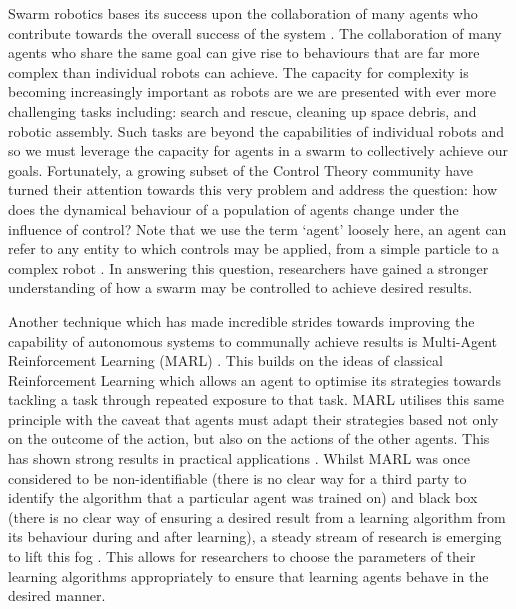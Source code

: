 \documentclass[.../main.tex]{subfiles}
\begin{document}
    Swarm robotics bases its success upon the collaboration of many agents who contribute towards
    the overall success of the system \cite{Hamann2018}. The collaboration of many agents who share
    the same goal can give rise to behaviours that are far more complex than individual robots can
    achieve. The capacity for complexity is becoming increasingly important as robots are we are
    presented with ever more challenging tasks including: search and rescue, cleaning up space
    debris, and robotic assembly. Such tasks are beyond the capabilities of individual robots and so
    we must leverage the capacity for agents in a swarm to collectively achieve our goals.
    Fortunately, a growing subset of the Control Theory community have turned their attention
    towards this very problem and address the question: how does the dynamical behaviour of a
    population of agents change under the influence of control? Note that we use the term `agent'
    loosely here, an agent can refer to any entity to which controls may be applied, from a simple
    particle \cite{Roy2017} to a complex robot \cite{Elamvazhuthi2019}. In answering this question,
    researchers have gained a stronger understanding of how a swarm may be controlled to achieve
    desired results.

    Another technique which has made incredible strides towards improving the capability of
    autonomous systems to communally achieve results is Multi-Agent Reinforcement Learning (MARL)
    \cite{SchwartzMulti-agentApproach}. This builds on the ideas of classical Reinforcement Learning
    which allows an agent to optimise its strategies towards tackling a task through repeated
    exposure to that task. MARL utilises this same principle with the caveat that agents must adapt
    their strategies based not only on the outcome of the action, but also on the actions of the
    other agents. This has shown strong results in practical applications \cite{Woolridge2009,
    SchwartzMulti-agentApproach, Yang2004}. Whilst MARL was once considered to be non-identifiable
    (there is no clear way for a third party to identify the algorithm that a particular agent was
    trained on) and black box (there is no clear way of ensuring a desired result from a learning
    algorithm from its behaviour during and after learning), a steady stream of research is emerging
    to lift this fog \cite{Bloembergen2015}. This allows for researchers to choose the parameters of
    their learning algorithms appropriately to ensure that learning agents behave in the desired
    manner.
\end{document}
